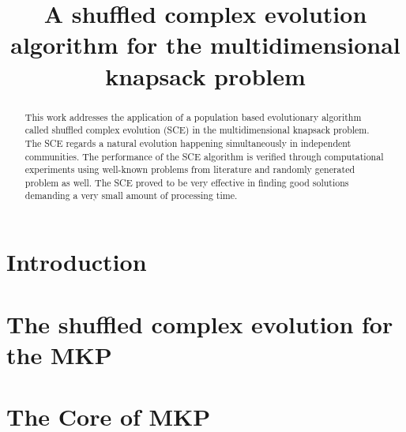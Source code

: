 \documentclass[10pt,conference, compsocconf]{IEEEtran}
\begin{document}
\title{A shuffled complex evolution algorithm for
the multidimensional knapsack problem}

\author{
\and
{}
}

\maketitle

\begin{abstract}
This work addresses the application of
a population based evolutionary algorithm
called shuffled complex evolution (SCE) in the multidimensional knapsack
problem.
The SCE regards a natural evolution happening simultaneously in independent communities.
The performance of the SCE algorithm is verified through computational experiments
using well-known problems from literature and randomly generated problem as well.
The SCE proved to be very effective in finding good solutions demanding a
very small amount of processing time.

\end{abstract}
\IEEEpeerreviewmaketitle

\section{Introduction}
\label{sec:intro}


\section{The shuffled complex evolution for the MKP}
\label{sec:sce}


\section{The Core of MKP}
\label{sec:sce}

\end{document}
